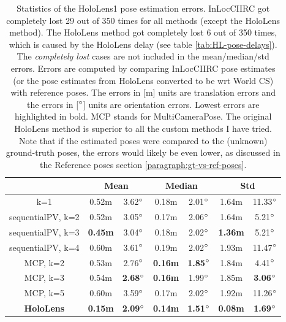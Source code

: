 \documentclass[twoside]{ctuthesis}
\theoremstyle{plain}
\theoremstyle{definition}
\theoremstyle{note}
\begin{document}
\begin{table}[htb!]
	\centering
	\begin{tabular}{|c|c|c|c|c|c|c|}
		\hline
		\diagbox{\small Method}{\small Statistics} & \multicolumn{2}{c|}{Mean} & \multicolumn{2}{c|}{Median} & \multicolumn{2}{c|}{Std} \\
		\hline
		k=1 & 0.52m & 3.62$\degree$ & 0.18m & 2.01$\degree$ & 1.64m & 11.33$\degree$ \\
		\hline
		sequentialPV, k=2 & 0.52m & 3.05$\degree$ & 0.17m & 2.06$\degree$ & 1.64m & 5.21$\degree$ \\
		\hline
		sequentialPV, k=3 & \bfseries 0.45m & 3.04$\degree$ & 0.18m & 2.02$\degree$ & \bfseries 1.36m & 5.21$\degree$ \\
		\hline
		sequentialPV, k=4 & 0.60m & 3.61$\degree$ & 0.19m & 2.02$\degree$ & 1.93m & 11.47$\degree$ \\
		\hline
		MCP, k=2 & 0.53m & 2.76$\degree$ & \bfseries 0.16m & \bfseries 1.85$\degree$ & 1.84m & 4.41$\degree$ \\
		\hline
		MCP, k=3 & 0.54m & \bfseries 2.68$\degree$ & \bfseries 0.16m & 1.99$\degree$ & 1.85m & \bfseries 3.06$\degree$ \\
		\hline
		MCP, k=5 & 0.60m & 3.59$\degree$ & 0.17m & 2.02$\degree$ & 1.92m & 11.26$\degree$ \\
		\hline
		\bfseries HoloLens & \bfseries 0.15m & \bfseries 2.09$\degree$ & \bfseries 0.14m & \bfseries 1.51$\degree$ & \bfseries 0.08m & \bfseries 1.69$\degree$ \\
		\hline
	\end{tabular}
	\caption[HoloLens1 pose estimation error statistics]{Statistics of the HoloLens1 pose estimation errors. InLocCIIRC got completely lost 29 out of 350 times for all methods (except the HoloLens method). The HoloLens method got completely lost 6 out of 350 times, which is caused by the HoloLens delay (see table \ref{tab:HL-pose-delays}). The \emph{completely lost} cases are not included in the mean/median/std errors. Errors are computed by comparing InLocCIIRC pose estimates (or the pose estimates from HoloLens converted to be wrt World CS) with reference poses. The errors in [m] units are translation errors and the errors in [$\degree$] units are orientation errors. Lowest errors are highlighted in bold. MCP stands for MultiCameraPose. The original HoloLens method is superior to all the custom methods I have tried. Note that if the estimated poses were compared to the (unknown) ground-truth poses, the errors would likely be even lower, as discussed in the Reference poses section \ref{paragraph:gt-vs-ref-poses}.}
	\label{tab:HL1-other-statistics}
\end{table}
\end{document}
